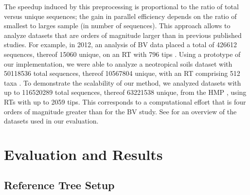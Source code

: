 The speedup induced by this preprocessing is proportional to the ratio of total versus unique sequences;
the gain in parallel efficiency depends on the ratio of smallest to larges sample (in number of sequences).
This approach allows to analyze datasets that are orders of magnitude larger than in previous published studies.
For example, in 2012, an analysis of \acf{BV} data
placed a total of \num{426 612} sequences, thereof \num{15 060} unique,
on an \ac{RT} with \num{796} tips \citep{Srinivasan2012}.
Using a prototype of our implementation,
we were able to analyze a neotropical soils dataset with \num{50 118 536} total sequences, thereof \num{10 567 804} unique,
with an \ac{RT} comprising \num{512} taxa \citep{Mahe2017}.
To demonstrate the scalability of our method,
we analyzed datasets with up to \num{116 520 289} total sequences, thereof \num{63 221 538} unique,
from the \ac{HMP} \citep{Huttenhower2012,Methe2012}, using \acp{RT} with up to \num{2 059} tips.
This corresponds to %
a computational effort that is four orders of magnitude greater than for the \ac{BV} study.
See  for an overview of the datasets used in our evaluation.


\section{Evaluation and Results}
\label{ch:AutomaticTrees:sec:Evaluation}


\subsection{Reference Tree Setup}
\label{ch:AutomaticTrees:sec:Evaluation:sub:ReferenceTreeSetup}

